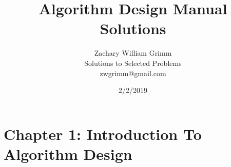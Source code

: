 \documentclass[12pt,fleqn,leqno,letterpaper]{article}
\title{Algorithm Design Manual Solutions}
\author{Zachary William Grimm\\
  \small{Solutions to Selected Problems}\\
  \small{zwgrimm@gmail.com}
}
\date{2/2/2019}
\begin{document}
\maketitle



\section*{Chapter 1: Introduction To Algorithm Design}





% 
\end{document}

